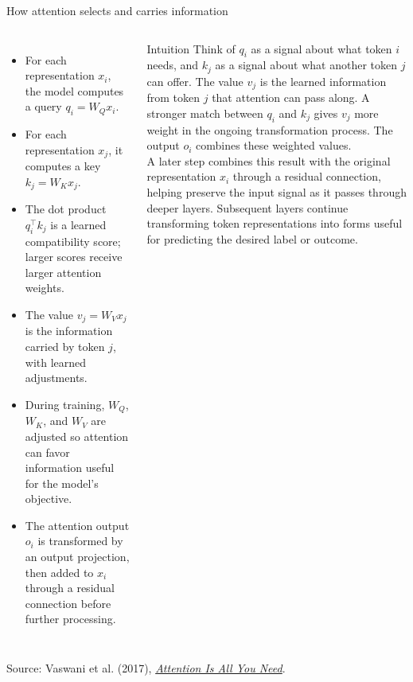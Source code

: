 \documentclass[11pt,aspectratio=169,hyperref={colorlinks}]{beamer}
\newcommand{\slidesource}[1]{\par\vfill\noindent\parbox{\linewidth}{\tiny\color{sourcegray}\raggedright\sloppy Source: #1.}}
\begin{document}
\begin{frame}{How attention selects and carries information}
\footnotesize
\begin{columns}[c]
\begin{itemize}\itemsep.25em\scriptsize
\item For each representation $x_i$, the model computes a query $q_i = W_Q x_i$.
\item For each representation $x_j$, it computes a key $k_j = W_K x_j$.
\item The dot product $q_i^\top k_j$ is a learned compatibility score; larger scores receive larger attention weights.
\item The value $v_j = W_V x_j$ is the information carried by token $j$, with learned adjustments. 
\item During training, $W_Q$, $W_K$, and $W_V$ are adjusted so attention can favor information useful for the model's objective.
\item The attention output $o_i$ is transformed by an output projection, then added to $x_i$ through a residual connection before further processing.
\end{itemize}
\begin{block}{Intuition}\scriptsize
Think of $q_i$ as a signal about what token $i$ needs, and $k_j$ as a signal about what another token $j$ can offer. The value $v_j$ is the learned information from token $j$ that attention can pass along. A stronger match between $q_i$ and $k_j$ gives $v_j$ more weight in the ongoing transformation process. The output $o_i$ combines these weighted values.\\
\vspace{8pt}
A later step combines this result with the original representation $x_i$ through a residual connection, helping preserve the input signal as it passes through deeper layers. Subsequent layers continue transforming token representations into forms useful for predicting the desired label or outcome.
\end{block}
\end{columns}
\slidesource{Vaswani et al. (2017), \href{https://arxiv.org/abs/1706.03762}{\emph{Attention Is All You Need}}}
\end{frame}
\end{document}
